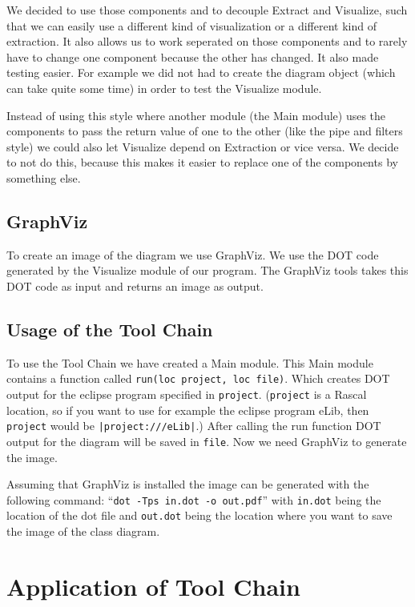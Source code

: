 \documentclass[a4paper,11pt]{article}
\begin{document}
	We decided to use those components and to decouple Extract and Visualize, such that we can easily use a different kind of visualization or a different kind of extraction.
	It also allows us to work seperated on those components and to rarely have to change one component because the other has changed.
	It also made testing easier. For example we did not had to create the diagram object (which can take quite some time) in order to test the Visualize module.
	
	Instead of using this style where another module (the Main module) uses the components to pass the return value of one
	to the other (like the pipe and filters style) we could also let Visualize depend on Extraction or vice versa.
	We decide to not do this, because this makes it easier to replace one of the components by something else.
	
	\subsection{GraphViz}
	
	To create an image of the diagram we use GraphViz.
	We use the DOT code generated by the Visualize module of our program.
	The GraphViz tools takes this DOT code as input and returns an image as output.
	
	\subsection{Usage of the Tool Chain}
	To use the Tool Chain we have created a Main module.
	This Main module contains a function called \texttt{run(loc project, loc file)}.
	Which creates DOT output for the eclipse program specified in \texttt{project}.
	(\texttt{project} is a Rascal location, so if you want to use for example the eclipse program eLib, then
	\texttt{project} would be \texttt{|project:///eLib|}.)
	After calling the run function DOT output for the diagram will be saved in \texttt{file}.
	Now we need GraphViz to generate the image.
	
	Assuming that GraphViz is installed the image can be generated with the following command:
	``\texttt{dot -Tps in.dot -o out.pdf}'' with \texttt{in.dot} being the location of the dot file and \texttt{out.dot}
	being the location where you want to save the image of the class diagram.
	
	
	
	\section{Application of Tool Chain}
		
\end{document}
